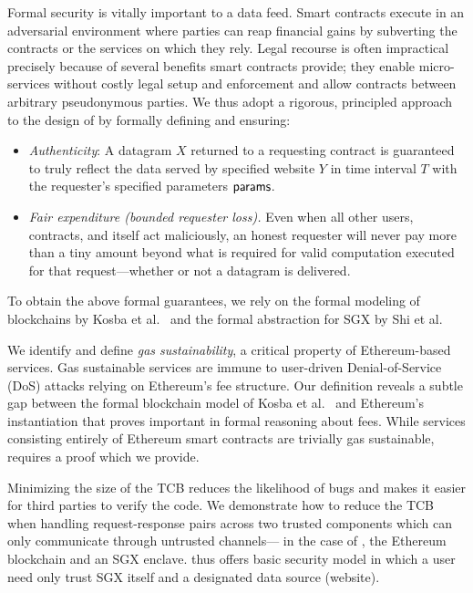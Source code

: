 \vspace{1ex}
Formal security is vitally important to a data feed.
Smart contracts execute in an adversarial environment where parties can reap financial gains by subverting the contracts or the services on which they rely.
Legal recourse is often impractical precisely because of several benefits smart contracts provide;
they enable micro-services without costly legal setup and enforcement and allow contracts between arbitrary pseudonymous parties.
We thus adopt a rigorous, principled approach to the design of \tcs by formally defining and ensuring:

\begin{itemize}[leftmargin=5mm]
\item
  \setlength{\itemsep}{2pt}
  \setlength{\parskip}{0pt}
  \setlength{\parsep}{0pt}
{\it Authenticity}: A datagram $X$ returned
to a requesting contract is guaranteed
to truly reflect the data served by specified website $Y$ in time interval $T$ with the requester's specified parameters ${\sf params}$.
\item
{\it Fair expenditure (bounded requester loss).}
Even when all other users, contracts, and \tc itself act maliciously,
an honest requester will never pay more than a tiny amount beyond what is required for valid computation executed for that request---whether or not a datagram is delivered.
\end{itemize}

To obtain the above formal guarantees, we rely on the formal modeling
of blockchains by Kosba et al.~\cite{hawk} and the formal abstraction for SGX by Shi et al.~\cite{sgxsok}

\vspace{1ex}
We identify and define \emph{gas sustainability}, a critical property of Ethereum-based services.
Gas sustainable services are immune to user-driven Denial-of-Service (DoS) attacks relying on Ethereum's fee structure.
Our definition reveals a subtle gap between the formal blockchain model of Kosba et al.~\cite{hawk}
and Ethereum's instantiation that proves important in formal reasoning about fees.
While services consisting entirely of Ethereum smart contracts are trivially gas sustainable, \tc requires a proof which we provide.

\vspace{1ex}
Minimizing the size of the TCB reduces the likelihood of bugs and makes it easier for third parties to verify the code.
We demonstrate how to reduce the TCB when handling request-response pairs across two trusted components which can only communicate through untrusted channels---%
in the case of \tc, the Ethereum blockchain and an SGX enclave.
\tc thus offers basic security model in which a user need only trust SGX itself and a designated data source (website).

